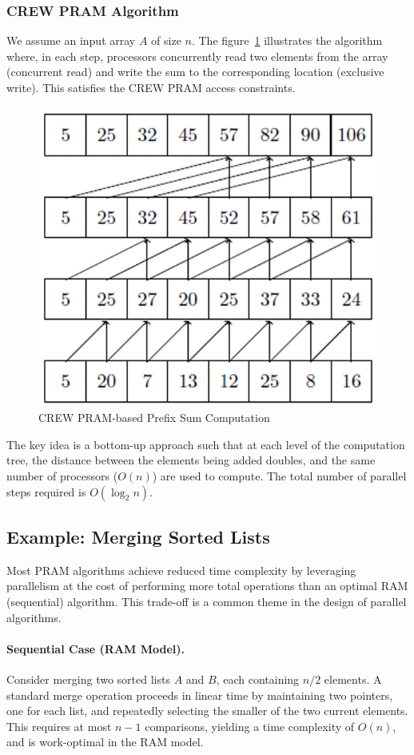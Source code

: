 \documentclass[12pt]{book}
\begin{document}
\subsubsection{CREW PRAM Algorithm}
We assume an input array $A$ of size $n$. The figure~\ref{fig:CREW_prefix} illustrates the algorithm where, in each step, processors concurrently read two elements from the array (concurrent read) and write the sum to the corresponding location (exclusive write). This satisfies the CREW PRAM access constraints.

\begin{figure}[H]
    \centering
    \includegraphics[width=0.6\linewidth]{images/CREW_prefix.png}
    \caption{CREW PRAM-based Prefix Sum Computation}
    \label{fig:CREW_prefix}
\end{figure}

The key idea is a bottom-up approach such that at each level of the computation tree, the distance between the elements being added doubles, and the same number of processors ($O(n)$) are used to compute. The total number of parallel steps required is $O(\log_2 n)$.

\subsection{Example: Merging Sorted Lists}

Most PRAM algorithms achieve reduced time complexity by leveraging parallelism at the cost of performing more total operations than an optimal RAM (sequential) algorithm. This trade-off is a common theme in the design of parallel algorithms.

\paragraph{Sequential Case (RAM Model).}  
Consider merging two sorted lists $A$ and $B$, each containing $n/2$ elements. A standard merge operation proceeds in linear time by maintaining two pointers, one for each list, and repeatedly selecting the smaller of the two current elements. This requires at most $n - 1$ comparisons, yielding a time complexity of $O(n)$, and is work-optimal in the RAM model.
\end{document}
